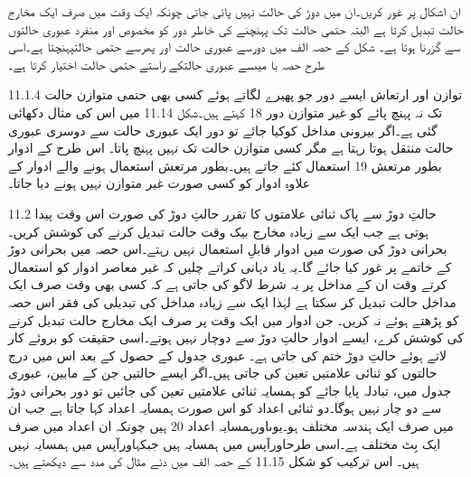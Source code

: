 	ان اشکال پر غور کریں۔ان میں دوڑ کی حالت نہیں پائی جاتی چونکہ ایک وقت میں صرف ایک مخارج حالت تبدیل کرتا ہے البتہ حتمی حالت تک پہنچنے کی خاطر دور کو مخصوص اور منفرد عبوری حالتوں سے گزرنا ہوتا ہے۔
	شکل کے حصہ الف میں دورسے عبوری حالت اور پھرسے حتمی حالتپہنچتا ہے۔اسی طرح حصہ با میںسے   عبوری حالتکے راستے حتمی حالت اختیار کرتا ہے۔

11.1.4 توازن اور ارتعاش 
	 ایسے دور جو پھیرے لگاتے ہوئے کسی بھی حتمی متوازن حالت تک نہ پہنچ پائے کو غیر متوازن دور 18 کہتے ہیں۔شکل 11.14 میں اس کی مثال دکھائی گئی ہے۔اگر بیرونی مداخل کوکیا جائے تو دور ایک عبوری حالت سے دوسری عبوری حالت منتقل ہوتا رہتا ہے مگر کسی متوازن حالت تک نہیں پہنچ پاتا۔
	اس طرح کے ادوار بطور مرتعش 19 استعمال کئے جاتے ہیں۔بطور مرتعش استعمال ہونے والے ادوار کے علاوہ ادوار کو کسی صورت غیر متوازن نہیں ہونے دیا جاتا۔

11.2 حالتِ دوڑ سے پاک ثنائی علامتوں کا تقرر
	حالتِ دوڑ کی صورت اس وقت پیدا ہوتی ہے جب ایک سے زیادہ مخارج بیک وقت حالت تبدیل کرنے کی کوشش کریں۔بحرانی دوڑ کی صورت میں ادوار قابلِ استعمال نہیں رہتے۔اس حصہ میں بحرانی دوڑ کے خاتمے پر غور کیا جائے گا۔یہ یاد دہانی کراتے چلیں کہ غیر معاصر ادوار کو استعمال کرتے وقت ان کے مداخل پر یہ شرط لاگو کی جاتی ہے کہ کسی بھی وقت صرف ایک مداخل حالت تبدیل کر سکتا ہے لہٰذا ایک سے زیادہ مداخل کی تبدیلی کی فقر اس حصہ کو پڑھتے ہوئے نہ کریں۔
	جن ادوار میں ایک وقت پر صرف ایک مخارج حالت تبدیل کرنے کی کوشش کرے، ایسے ادوار حالتِ دوڑ سے دوچار نہیں ہوتے۔اسی حقیقت کو بروئے کار لاتے ہوئے حالتِ دوڑ ختم کی جاتی ہے۔
	عبوری جدول کے حصول کے بعد اس میں درج حالتوں کو ثنائی علامتیں تعین کی جاتی ہیں۔اگر ایسے حالتیں جن کے مابین، عبوری جدول میں، تبادلہ پایا جائے کو  ہمسایہ ثنائی علامتیں تعین کی جائیں تو دور بحرانی دوڑ سے دو چار نہیں ہوگا۔دو ثنائی اعداد کو اس صورت ہمسایہ اعداد کہا جاتا ہے جب ان میں صرف ایک ہندسہ مختلف ہو۔یوںاورہمسایہ اعداد 20 ہیں چونکہ ان اعداد میں صرف ایک بِٹ مختلف ہے۔اسی طرحاورآپس میں ہمسایہ ہیں جبکہاورآپس میں ہمسایہ نہیں ہیں۔
	اس ترکیب کو شکل 11.15 کے حصہ الف میں دئے مثال کی مدد سے دیکھتے ہیں۔



